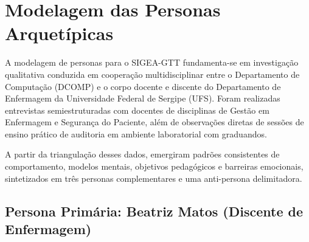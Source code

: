 \chapter{Modelagem das Personas Arquetípicas}
\label{cap_personas_arquetipicas}

A modelagem de personas para o SIGEA-GTT fundamenta-se em investigação qualitativa conduzida em cooperação multidisciplinar entre o Departamento de Computação (DCOMP) e o corpo docente e discente do Departamento de Enfermagem da Universidade Federal de Sergipe (UFS). Foram realizadas entrevistas semiestruturadas com docentes de disciplinas de Gestão em Enfermagem e Segurança do Paciente, além de observações diretas de sessões de ensino prático de auditoria em ambiente laboratorial com graduandos.

A partir da triangulação desses dados, emergiram padrões consistentes de comportamento, modelos mentais, objetivos pedagógicos e barreiras emocionais, sintetizados em três personas complementares e uma anti-persona delimitadora.

\section{Persona Primária: Beatriz Matos (Discente de Enfermagem)}
\label{sec_persona_beatriz}

